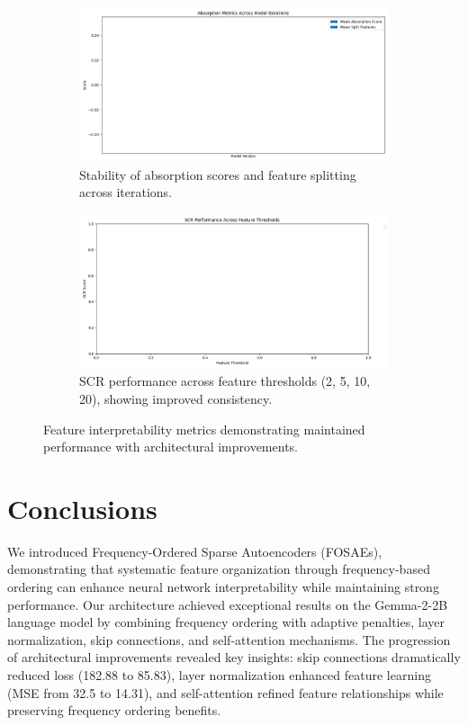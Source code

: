 \documentclass{article} %
\begin{document}
\begin{figure}[h]
    \centering
    \begin{subfigure}{0.49\textwidth}
        \includegraphics[width=\textwidth]{absorption_metrics.png}
        \caption{Stability of absorption scores and feature splitting across iterations.}
        \label{fig:absorption_metrics}
    \end{subfigure}
    \hfill
    \begin{subfigure}{0.49\textwidth}
        \includegraphics[width=\textwidth]{scr_threshold_comparison.png}
        \caption{SCR performance across feature thresholds (2, 5, 10, 20), showing improved consistency.}
        \label{fig:scr_threshold}
    \end{subfigure}
    \caption{Feature interpretability metrics demonstrating maintained performance with architectural improvements.}
    \label{fig:interpretability_results}
\end{figure}

\section{Conclusions}
\label{sec:conclusion}

We introduced Frequency-Ordered Sparse Autoencoders (FOSAEs), demonstrating that systematic feature organization through frequency-based ordering can enhance neural network interpretability while maintaining strong performance. Our architecture achieved exceptional results on the Gemma-2-2B language model by combining frequency ordering with adaptive penalties, layer normalization, skip connections, and self-attention mechanisms. The progression of architectural improvements revealed key insights: skip connections dramatically reduced loss (182.88 to 85.83), layer normalization enhanced feature learning (MSE from 32.5 to 14.31), and self-attention refined feature relationships while preserving frequency ordering benefits.
\end{document}
